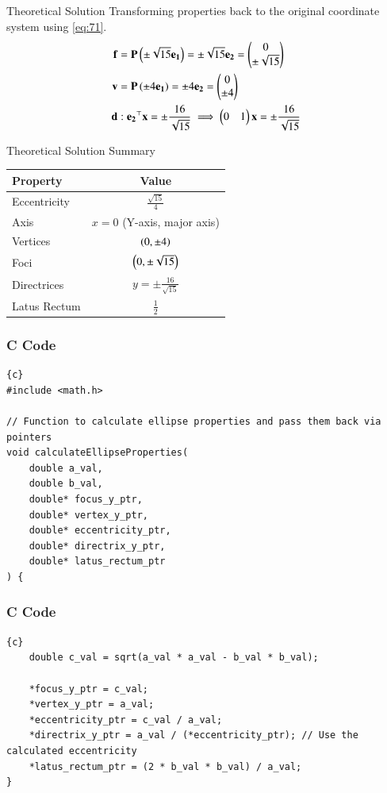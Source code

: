 \documentclass{beamer}
\begin{document}
\begin{frame}{Theoretical Solution}
Transforming properties back to the original coordinate system using \eqref{eq:71}.
\begin{align}
    \mathbf{f} &= \mathbf{P}\left(\pm \sqrt{15}\mathbf{e_1}\right) = \pm \sqrt{15}\mathbf{e_2} = \begin{pmatrix}0 \\ \pm \sqrt{15}\end{pmatrix} \\
    \mathbf{v} &= \mathbf{P}\left(\pm 4\mathbf{e_1}\right) = \pm 4\mathbf{e_2} = \begin{pmatrix}0 \\ \pm 4\end{pmatrix} \\
    \mathbf{d} &: \mathbf{e_2}^\top\mathbf{x} = \pm \frac{16}{\sqrt{15}} \implies \begin{pmatrix}0 & 1\end{pmatrix}\mathbf{x} = \pm \frac{16}{\sqrt{15}}
\end{align}
\end{frame}

\begin{frame}{Theoretical Solution Summary}
\begin{center}
\begin{tabular}{|l|c|}
    \hline
    \textbf{Property} & \textbf{Value} \\
    \hline
    Eccentricity & $\frac{\sqrt{15}}{4}$ \\
    \hline
    Axis & $x=0$ (Y-axis, major axis) \\
    \hline
    Vertices & $\left(0, \pm 4\right)$ \\
    \hline
    Foci & $\left(0, \pm \sqrt{15}\right)$ \\
    \hline
    Directrices & $y = \pm \frac{16}{\sqrt{15}}$ \\
    \hline
    Latus Rectum & $\frac{1}{2}$ \\
    \hline
\end{tabular}
\end{center}
\end{frame}

\begin{frame}[fragile]
\frametitle{C Code}
\begin{lstlisting}{c}
#include <math.h>

// Function to calculate ellipse properties and pass them back via pointers
void calculateEllipseProperties(
    double a_val,
    double b_val,
    double* focus_y_ptr,
    double* vertex_y_ptr,
    double* eccentricity_ptr,
    double* directrix_y_ptr,
    double* latus_rectum_ptr
) {
\end{lstlisting}
\end{frame}

\begin{frame}[fragile]
\frametitle{C Code}
\begin{lstlisting}{c}
    double c_val = sqrt(a_val * a_val - b_val * b_val);

    *focus_y_ptr = c_val;
    *vertex_y_ptr = a_val;
    *eccentricity_ptr = c_val / a_val;
    *directrix_y_ptr = a_val / (*eccentricity_ptr); // Use the calculated eccentricity
    *latus_rectum_ptr = (2 * b_val * b_val) / a_val;
}
\end{lstlisting}
\end{frame}
\end{document}
